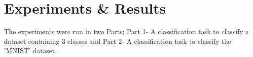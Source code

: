 \section{Experiments \& Results}

The experiments were run in two Parts; Part 1- A classification task to classify a dataset containing 3 classes and 
Part 2- A classification task to classify the 'MNIST' dataset. 

